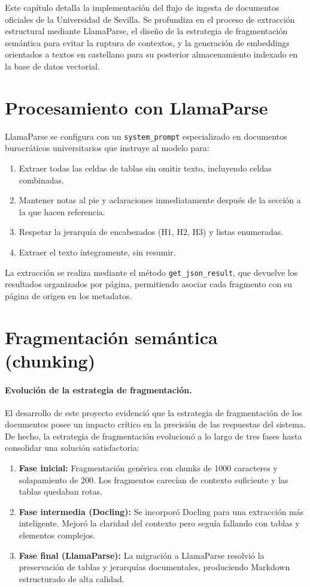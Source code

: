 \documentclass[12pt,a4paper,oneside]{report}
\begin{document}
Este capítulo detalla la implementación del flujo de ingesta de documentos oficiales de la Universidad de Sevilla. Se profundiza en el proceso de extracción estructural mediante LlamaParse, el diseño de la estrategia de fragmentación semántica para evitar la ruptura de contextos, y la generación de embeddings orientados a textos en castellano para su posterior almacenamiento indexado en la base de datos vectorial.

\section{Procesamiento con LlamaParse}

LlamaParse se configura con un \texttt{system\_prompt} especializado en documentos burocráticos universitarios que instruye al modelo para:

\begin{enumerate}
    \item Extraer todas las celdas de tablas sin omitir texto, incluyendo celdas combinadas.
    \item Mantener notas al pie y aclaraciones inmediatamente después de la sección a la que hacen referencia.
    \item Respetar la jerarquía de encabezados (H1, H2, H3) y listas enumeradas.
    \item Extraer el texto íntegramente, sin resumir.
\end{enumerate}

La extracción se realiza mediante el método \texttt{get\_json\_result}, que devuelve los resultados organizados por página, permitiendo asociar cada fragmento con su página de origen en los metadatos.

\section{Fragmentación semántica (chunking)}
\paragraph{Evolución de la estrategia de fragmentación.} El desarrollo de este proyecto evidenció que la estrategia de fragmentación de los documentos posee un impacto crítico en la precisión de las respuestas del sistema. De hecho, la estrategia de fragmentación evolucionó a lo largo de tres fases hasta consolidar una solución satisfactoria:

\begin{enumerate}
    \item \textbf{Fase inicial:} Fragmentación genérica con chunks de 1000 caracteres y solapamiento de 200. Los fragmentos carecían de contexto suficiente y las tablas quedaban rotas.
    \item \textbf{Fase intermedia (Docling):} Se incorporó Docling para una extracción más inteligente. Mejoró la claridad del contexto pero seguía fallando con tablas y elementos complejos.
    \item \textbf{Fase final (LlamaParse):} La migración a LlamaParse resolvió la preservación de tablas y jerarquías documentales, produciendo Markdown estructurado de alta calidad.
\end{enumerate}
\end{document}
